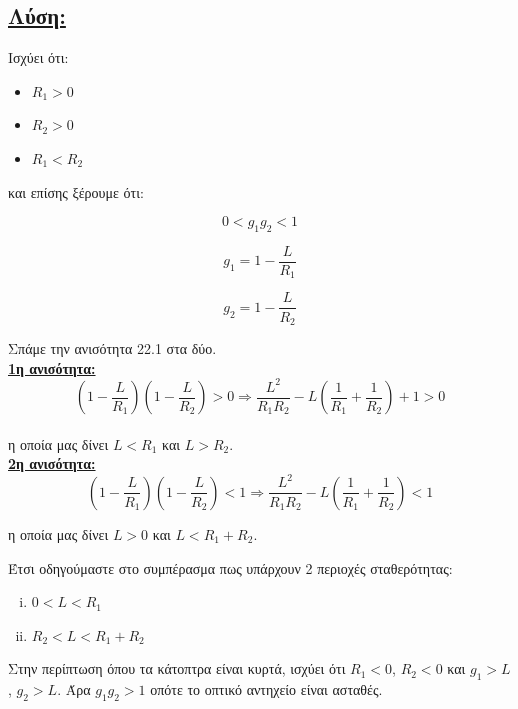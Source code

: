 \documentclass[a4paper,11pt,titlepage]{article}
\numberwithin{equation}{section} %
\begin{document}
\subsection*{\underline{Λύση:}}

Ισχύει ότι:

\begin{itemize}
 \item $R_1>0$
 \item $R_2>0$
 \item $R_1<R_2$
\end{itemize}

και επίσης ξέρουμε ότι:

\begin{equation}
 0<g_1g_2<1
\end{equation}

\begin{equation}
  g_1=1-\dfrac{L}{R_1}
\end{equation}

\begin{equation}
  g_2=1-\dfrac{L}{R_2}
\end{equation}

Σπάμε την ανισότητα 22.1 στα δύο.\\[0.5cm]

\textbf{\underline{1η ανισότητα:}}
\begin{equation}
 (1-\dfrac{L}{R_1})(1-\dfrac{L}{R_2})>0\Longrightarrow\dfrac{L^2}{R_1R_2}-L(\dfrac{1}{R_1}+\dfrac{1}{R_2})+1>0
\end{equation}
\\[0.3cm]
η οποία μας δίνει $L<R_1 $ και $L>R_2$.\\[0.5cm]

\textbf{\underline{2η ανισότητα:}}
\begin{equation}
 (1-\dfrac{L}{R_1})(1-\dfrac{L}{R_2})<1\Longrightarrow\dfrac{L^2}{R_1R_2}-L(\dfrac{1}{R_1}+\dfrac{1}{R_2})<1
\end{equation}

η οποία μας δίνει $L>0$ και $L<R_1+R_2$.

Έτσι οδηγούμαστε στο συμπέρασμα πως υπάρχουν 2 περιοχές σταθερότητας:
\begin{enumerate}[(i)]
 \item $0<L<R_1$
 \item $R_2<L<R_1+R_2$
\end{enumerate}

Στην περίπτωση όπου τα κάτοπτρα είναι κυρτά, ισχύει ότι $R_1<0$, $R_2<0$ και $g_1>L$, $g_2>L$. Άρα $g_1g_2>1$ οπότε το οπτικό αντηχείο είναι ασταθές.
\newpage
\end{document}
